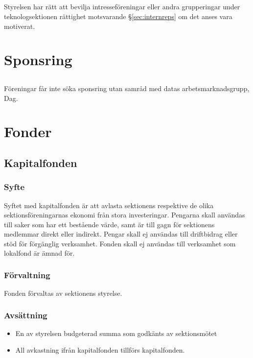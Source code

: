 \documentclass[a4paper, 10pt]{article}
\begin{document}
\subsection{}
Styrelsen har rätt att bevilja intresseföreningar eller andra grupperingar under teknologsektionen rättighet motsvarande §\ref{sec:internreps} om det anses vara motiverat.

\section{Sponsring}
\subsection{}
Föreningar får inte söka sponsring utan samråd med datas
arbetsmarknadsgrupp, Dag.

\section{Fonder}
\subsection{Kapitalfonden}
\subsubsection{Syfte}
\label{sec:kapitalfond_syfte}
Syftet med kapitalfonden är att avlasta sektionens respektive de olika sektionsföreningarnas ekonomi från stora investeringar. Pengarna skall användas till saker som har ett bestående värde, samt är till gagn för sektionens medlemmar direkt eller indirekt. Pengar skall ej användas till driftbidrag eller stöd för förgänglig verksamhet. Fonden skall ej användas till verksamhet som lokalfond är ämnad för.
\subsubsection{Förvaltning}
Fonden förvaltas av sektionens styrelse.
\subsubsection{Avsättning}
\begin{itemize}
\item En av styrelsen budgeterad summa som godkänts av sektionsmötet
\item All avkastning ifrån kapitalfonden tillförs kapitalfonden.
\end{itemize}
\end{document}
